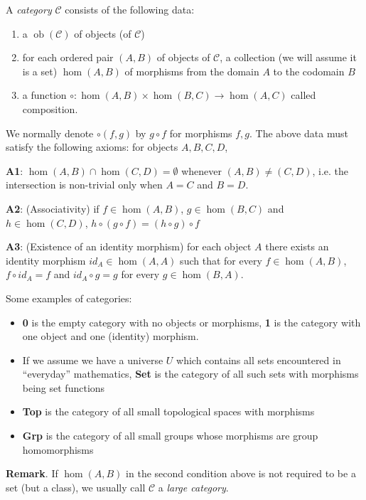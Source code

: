 \documentclass[12pt]{article}
\begin{document}
A \emph{category} $\mathcal{C}$ consists of the following data:
\begin{enumerate}
\item a  $\operatorname{ob}(\mathcal{C})$ of objects (of $\mathcal{C}$)
\item for each ordered pair $(A,B)$ of objects of $\mathcal{C}$, a collection (we will assume it is
 a set) $\hom(A,B)$ of morphisms from the domain $A$ to the codomain $B$
\item a function $\circ:\hom(A,B)\times\hom(B,C)\to\hom(A,C)$ called composition.
\end{enumerate}

We normally denote $\circ(f,g)$ by $g \circ f$ for morphisms $f,g$. The above data must satisfy the following axioms: for objects $A,B,C,D$,

\textbf{A1}: $\hom(A,B) \cap \hom(C,D)=\emptyset$ whenever $(A,B)\neq (C,D)$, i.e. the intersection is non-trivial only when $A=C$ and $B=D$.

\textbf{A2}: (Associativity) if $f \in \hom(A,B)$, $g\in\hom(B,C)$ and $h\in\hom(C,D)$, $h\circ (g\circ f)=(h\circ g)\circ f$

\textbf{A3}: (Existence of an identity morphism) for each object $A$ there exists an identity morphism $ {}id_{A}\in\hom(A,A)$ such that for every $f\in\hom(A,B)$, $f\circ id_{A}=f$ and $ {}id_{A}\circ g=g$ for every $g \in \hom(B,A)$.

Some examples of categories:
\begin{itemize}
\item \textbf{0} is the empty category with no objects or morphisms, \textbf{1} is the category with one object and one (identity) morphism.
\item If we assume we have a universe $U$ which contains all sets encountered in ``everyday'' mathematics,
\textbf{Set} is the category of all such  sets with morphisms being set functions
\item \textbf{Top} is the category of all small topological spaces with morphisms 
\item \textbf{Grp} is the category of all small groups whose morphisms are group homomorphisms 
\end{itemize}

\textbf{Remark}.  If $\hom(A,B)$ in the second condition above is not required to be a set (but a class), we usually call $\mathcal{C}$ a \emph{large category}.
\end{document}
